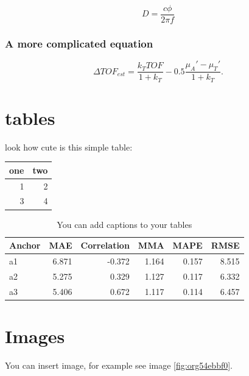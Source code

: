 \begin{equation}
\label{eq:org3329e08}
D = \frac{c\phi}{2\pi f}
\end{equation}

\subsubsection{A more complicated equation}
\label{sec:orge2bd82a}

\begin{equation}
\Delta TOF_{est} = \frac{k_T TOF}{1+k_T } - 0.5 \frac{\mu_A' - \mu_T'}{1+k_T}.
\end{equation}

\section{tables}
\label{sec:org7b31eb0}

look how cute is this simple table:

\begin{center}
\begin{tabular}{rr}
one & two\\
\hline
1 & 2\\
3 & 4\\
\end{tabular}
\end{center}

\begin{table}[htbp]
\caption{\label{tab:org877b973}
You can add captions to your tables}
\centering
\begin{tabular}{lrrrrr}
Anchor & MAE & Correlation & MMA & MAPE & RMSE\\
\hline
a1 & 6.871 & -0.372 & 1.164 & 0.157 & 8.515\\
a2 & 5.275 & 0.329 & 1.127 & 0.117 & 6.332\\
a3 & 5.406 & 0.672 & 1.117 & 0.114 & 6.457\\
\end{tabular}
\end{table}

\section{Images}
\label{sec:org5c546d9}
You can insert image, for example see image \ref{fig:org54ebbf0}.

